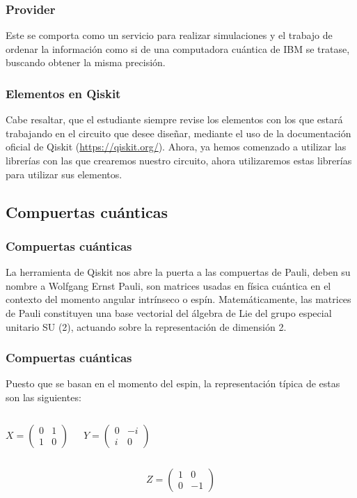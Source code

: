 \documentclass[spanish]{beamer}
\begin{document}
\newpage\justify\setlength{\parskip}{5mm}
\begin{frame}\frametitle{Provider} 
Este se comporta como un servicio para realizar simulaciones y el trabajo de ordenar la información como si de una computadora cuántica de IBM se tratase, buscando obtener la misma precisión.
\end{frame} 

\newpage\justify\setlength{\parskip}{5mm}
\begin{frame}\frametitle{Elementos en Qiskit}    
Cabe resaltar, que el estudiante siempre revise los elementos con los que estará trabajando en el circuito que desee diseñar, mediante el uso de la documentación oficial de Qiskit (\url{https://qiskit.org/}). Ahora, ya hemos comenzado a utilizar las librerías con las que crearemos nuestro circuito, ahora utilizaremos estas librerías para utilizar sus elementos.
 \end{frame}
 
\newpage\subsection{Compuertas cuánticas}\justify
\begin{frame}
\frametitle{Compuertas cuánticas}
La herramienta de Qiskit nos abre la puerta a las compuertas de Pauli, deben su nombre a Wolfgang Ernst Pauli, son matrices usadas en física cuántica en el contexto del momento angular intrínseco o espín. Matemáticamente, las matrices de Pauli constituyen una base vectorial del álgebra de Lie del grupo especial unitario SU (2), actuando sobre la representación de dimensión 2.
\end{frame}

\newpage\justify
\begin{frame}
\frametitle{Compuertas cuánticas}
Puesto que se basan en el momento del espin, la representación típica de estas son las siguientes:

\begin{columns}
\begin{equation}
X=\begin{pmatrix}
        0 & 1\\
        1 & 0
        \end{pmatrix}
    \end{equation}
    
\begin{equation}
Y=\begin{pmatrix}
        0 & -i\\
        i & 0
        \end{pmatrix}
    \end{equation}
\end{columns}

\begin{equation}
Z=\begin{pmatrix}
        1 & 0\\
        0 & -1
        \end{pmatrix}
    \end{equation}
\end{frame}
\end{document}
